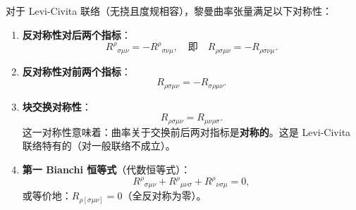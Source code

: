 \begin{property}[黎曼曲率张量的代数对称性]
对于 Levi-Civita 联络（无挠且度规相容），黎曼曲率张量满足以下对称性：

\begin{enumerate}
    \item \textbf{反对称性对后两个指标}：
    \begin{equation}
        R^\rho{}_{\sigma\mu\nu} = -R^\rho{}_{\sigma\nu\mu}, \quad \text{即} \quad R_{\rho\sigma\mu\nu} = -R_{\rho\sigma\nu\mu}.
    \end{equation}
    
    \item \textbf{反对称性对前两个指标}：
    \begin{equation}
        R_{\rho\sigma\mu\nu} = -R_{\sigma\rho\mu\nu}.
    \end{equation}
    
    \item \textbf{块交换对称性}：
    \begin{equation}
        R_{\rho\sigma\mu\nu} = R_{\mu\nu\rho\sigma}.
    \end{equation}
    这一对称性意味着：曲率关于交换前后两对指标是\textbf{对称的}。这是 Levi-Civita 联络特有的（对一般联络不成立）。
    
    \item \textbf{第一 Bianchi 恒等式}（代数恒等式）：
    \begin{equation}
        R^\rho{}_{\sigma\mu\nu} + R^\rho{}_{\mu\nu\sigma} + R^\rho{}_{\nu\sigma\mu} = 0,
    \end{equation}
    或等价地：$R_{\rho[\sigma\mu\nu]} = 0$（全反对称为零）。
\end{enumerate}
\end{property}

